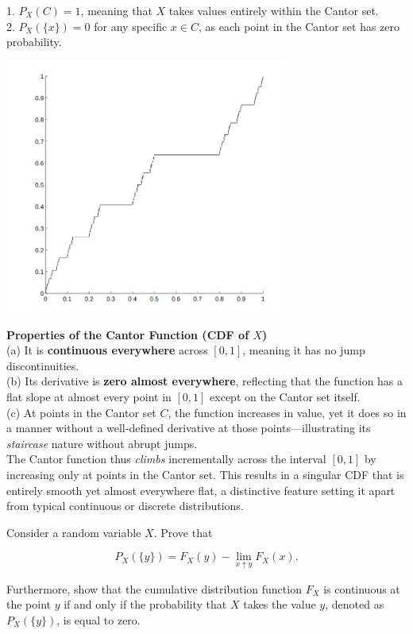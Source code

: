 1. \( P_X(C) = 1 \), meaning that \( X \) takes values entirely within the Cantor set.\\
2. \( P_X(\{x\}) = 0 \) for any specific \( x \in C \), as each point in the Cantor set has zero probability.\\

\begin{center}
    \includegraphics[width=0.7\textwidth]{chapters/chapter4/sections/plots/devils_staircase.png}
\end{center}

\textbf{Properties of the Cantor Function (CDF of \( X \))}\\

(a) It is \textbf{continuous everywhere} across \( [0, 1] \), meaning it has no jump discontinuities.\\
(b) Its derivative is \textbf{zero almost everywhere}, reflecting that the function has a flat slope at almost every point in \( [0, 1] \) except on the Cantor set itself.\\
(c) At points in the Cantor set \( C \), the function increases in value, yet it does so in a manner without a well-defined derivative at those points—illustrating its \textit{staircase} nature without abrupt jumps.\\

The Cantor function thus \textit{climbs} incrementally across the interval \( [0, 1] \) by increasing only at points in the Cantor set. This results in a singular CDF that is entirely smooth yet almost everywhere flat, a distinctive feature setting it apart from typical continuous or discrete distributions.


\begin{exercise}
    Consider a random variable \( X \). Prove that 

\[
P_X(\{y\}) = F_X(y) - \lim_{x \uparrow y} F_X(x).
\]

Furthermore, show that the cumulative distribution function \( F_X \) is continuous at the point \( y \) if and only if the probability that \( X \) takes the value \( y \), denoted as \( P_X(\{y\}) \), is equal to zero.
\end{exercise}

